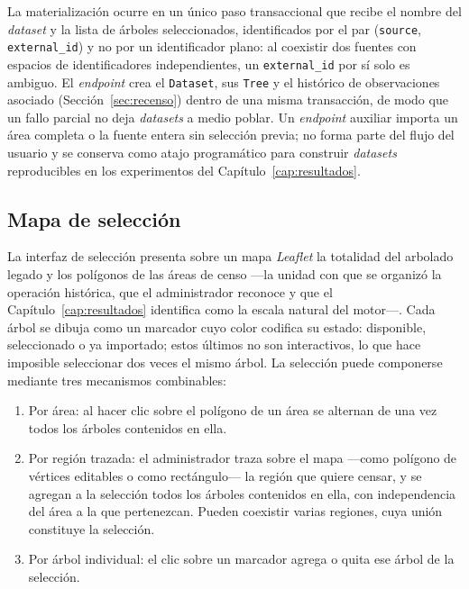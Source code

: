 La materialización ocurre en un único paso transaccional que recibe el nombre del \textit{dataset}
y la lista de árboles seleccionados, identificados por el par (\texttt{source},
\texttt{external\_id}) y no por un identificador plano: al coexistir dos fuentes con espacios de
identificadores independientes, un \texttt{external\_id} por sí solo es ambiguo. El
\textit{endpoint} crea el \texttt{Dataset}, sus \texttt{Tree} y el histórico de observaciones
asociado (Sección~\ref{sec:recenso}) dentro de una misma transacción, de modo que un fallo parcial
no deja \textit{datasets} a medio poblar. Un \textit{endpoint} auxiliar importa un área completa o
la fuente entera sin selección previa; no forma parte del flujo del usuario y se conserva como
atajo programático para construir \textit{datasets} reproducibles en los experimentos del
Capítulo~\ref{cap:resultados}.

\subsection{Mapa de selección}

La interfaz de selección presenta sobre un mapa \textit{Leaflet} la totalidad del arbolado legado y
los polígonos de las áreas de censo ---la unidad con que se organizó la operación histórica, que el
administrador reconoce y que el Capítulo~\ref{cap:resultados} identifica como la escala natural del
motor---. Cada árbol se dibuja como un marcador cuyo color codifica su estado: disponible,
seleccionado o ya importado; estos últimos no son interactivos, lo que hace imposible seleccionar
dos veces el mismo árbol. La selección puede componerse mediante tres mecanismos combinables:

\begin{enumerate}
  \item Por área: al hacer clic sobre el polígono de un área se alternan de una vez todos los
        árboles contenidos en ella.
  \item Por región trazada: el administrador traza sobre el mapa ---como polígono de vértices
        editables o como rectángulo--- la región que quiere censar, y se agregan a la selección
        todos los árboles contenidos en ella, con independencia del área a la que pertenezcan.
        Pueden coexistir varias regiones, cuya unión constituye la selección.
  \item Por árbol individual: el clic sobre un marcador agrega o quita ese árbol de la selección.
\end{enumerate}

